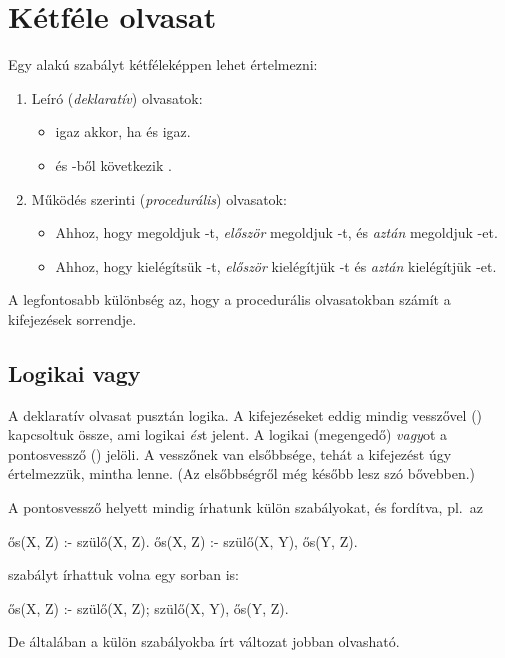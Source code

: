 \section{Kétféle olvasat}
Egy  alakú szabályt kétféleképpen
lehet értelmezni:
\begin{enumerate}
\item Leíró (\emph{deklaratív}) olvasatok:
  \begin{itemize}
    \item {} igaz akkor, ha  és  igaz.
    \item {} és -ből következik .
  \end{itemize}
\item Működés szerinti (\emph{procedurális}) olvasatok:
  \begin{itemize}
    \item Ahhoz, hogy megoldjuk -t,
      \emph{először} megoldjuk -t, és
      \emph{aztán} megoldjuk -et.
    \item Ahhoz, hogy kielégítsük -t,
      \emph{először} kielégítjük -t és
      \emph{aztán} kielégítjük -et.
  \end{itemize}
\end{enumerate}
A legfontosabb különbség az, hogy a procedurális
olvasatokban számít a kifejezések sorrendje.

\subsection*{Logikai vagy}
A deklaratív olvasat pusztán logika. A kifejezéseket
eddig mindig vesszővel (\pr{,}) kapcsoltuk össze,
ami logikai \emph{és}\/t jelent. A logikai
(megengedő) \emph{vagy}\/ot a pontosvessző (\pr{;})
jelöli. A vesszőnek van elsőbbsége, tehát a  kifejezést úgy értelmezzük, mintha
 lenne. (Az elsőbbségről
még később lesz szó bővebben.)\index{\pr{;}}

A pontosvessző helyett mindig írhatunk külön
szabályokat, és fordítva, pl.~az
\begin{program}
ős(X, Z) :- szülő(X, Z).
ős(X, Z) :- szülő(X, Y), ős(Y, Z).
\end{program}
szabályt írhattuk volna egy sorban is:
\begin{program}
ős(X, Z) :- szülő(X, Z); szülő(X, Y), ős(Y, Z).
\end{program}
De általában a külön szabályokba írt változat jobban
olvasható.

